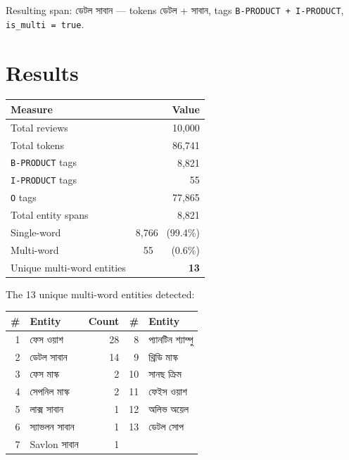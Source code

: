 \documentclass[11pt]{article}
\newcommand{\bn}[1]{{\bnfont #1}}
\begin{document}
\noindent Resulting span: \bn{ডেটল সাবান} --- tokens \bn{ডেটল} + \bn{সাবান},
tags \texttt{B-PRODUCT + I-PRODUCT}, \texttt{is\_multi = true}.


\section{Results}

\begin{center}
\begin{tabular}{@{}lr@{}}
\toprule
\textbf{Measure} & \textbf{Value} \\
\midrule
Total reviews                    & 10,000 \\
Total tokens                     & 86,741 \\
\texttt{B-PRODUCT} tags          & 8,821 \\
\texttt{I-PRODUCT} tags          & 55 \\
\texttt{O} tags                  & 77,865 \\
Total entity spans               & 8,821 \\
\quad Single-word                & 8,766 \ (99.4\%) \\
\quad Multi-word                 & 55 \ \ \ (0.6\%) \\
Unique multi-word entities       & \textbf{13} \\
\bottomrule
\end{tabular}
\end{center}

\noindent The 13 unique multi-word entities detected:

\begin{center}
\small
\begin{tabular}{@{}rl r rl@{}}
\toprule
\textbf{\#} & \textbf{Entity} & \textbf{Count} & \textbf{\#} & \textbf{Entity} \\
\midrule
1 & \bn{ফেস ওয়াশ}      & 28 & 8  & \bn{প্যানটিন শ্যাম্পু} \\
2 & \bn{ডেটল সাবান}     & 14 & 9  & \bn{থ্রিডি মাস্ক} \\
3 & \bn{ফেস মাস্ক}      & 2  & 10 & \bn{সানছ ক্রিম} \\
4 & \bn{সেপনিল মাস্ক}   & 2  & 11 & \bn{ফেইস ওয়াশ} \\
5 & \bn{লাক্স সাবান}    & 1  & 12 & \bn{অলিভ অয়েল} \\
6 & \bn{স্যাভলন সাবান}  & 1  & 13 & \bn{ডেটল সোপ} \\
7 & \bn{Savlon সাবান}   & 1  &    & \\
\bottomrule
\end{tabular}
\end{center}
\end{document}
